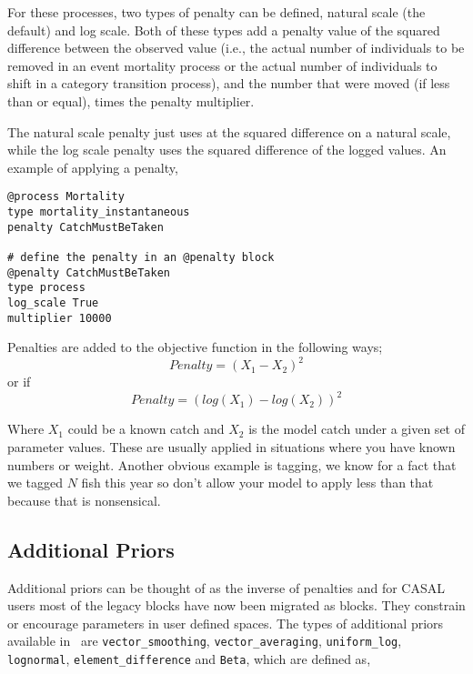 For these processes, two types of penalty can be defined, natural scale (the default) and log scale. Both of these types add a penalty value of the squared difference between the observed value (i.e., the actual number of individuals to be removed in an event mortality process or the actual number of individuals to shift in a category transition process), and the number that were moved (if less than or equal), times the penalty multiplier.

The natural scale penalty just uses at the squared difference on a natural scale, while the log scale penalty uses the squared difference of the logged values. An example of applying a penalty,

{\small{\begin{verbatim}
@process Mortality
type mortality_instantaneous
penalty CatchMustBeTaken	

# define the penalty in an @penalty block
@penalty CatchMustBeTaken
type process
log_scale True
multiplier 10000
\end{verbatim}}}

Penalties are added to the objective function in the following ways;
\begin{equation}
	Penalty = (X_1 - X_2)^2
\end{equation}
or if 
\begin{equation}
Penalty = (log(X_1) - log(X_2))^2
\end{equation}

Where $X_1$ could be a known catch and $X_2$ is the model catch under a given set of parameter values. These are usually applied in situations where you have known numbers or weight. Another obvious example is tagging, we know for a fact that we tagged $N$ fish this year so don't allow your model to apply less than that because that is nonsensical.

\subsection{Additional Priors\label{sec:additional_priors}}
Additional priors can be thought of as the inverse of penalties and for CASAL users most of the legacy  blocks have now been migrated as  blocks. They constrain or encourage parameters in user defined spaces. The types of additional priors available in \CNAME\ are \texttt{vector\_smoothing}, \texttt{vector\_averaging}, \texttt{uniform\_log}, \texttt{lognormal}, \texttt{element\_difference} and \texttt{Beta}, which are defined as,

